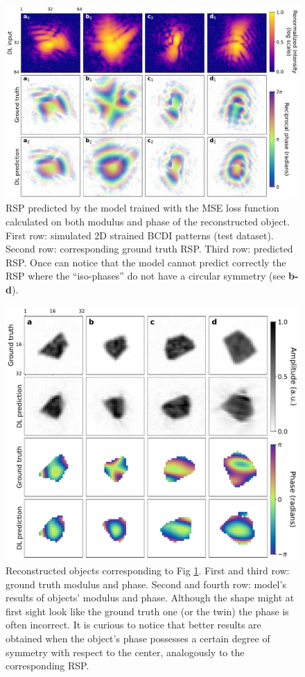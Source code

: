 \begin{figure}[H]
    \centering
    \includegraphics[width=\textwidth]{figures/Phasing/2D_hs_MSE_RSP.pdf}
    \caption{RSP predicted by the model trained with the MSE loss function calculated on both modulus and phase of the 
    reconstructed object. First row: simulated 2D strained BCDI patterns (test dataset). Second row: 
    corresponding ground truth RSP. Third row: predicted RSP. Once can notice that the model cannot predict correctly the 
    RSP where the ``iso-phases'' do not have a circular symmetry (see \textbf{b-d}).} 
    \label{fig:2D_hs_MSE_RSP}
\end{figure}

\begin{figure}[H]
    \centering
    \includegraphics[width=\textwidth]{figures/Phasing/2D_hs_MSE_obj.pdf}
    \caption{Reconstructed objects corresponding to Fig \ref{fig:2D_hs_MSE_RSP}. First and third row: ground truth modulus and phase. Second and fourth row: 
    model's results of objects' modulus and phase. Although the shape might at first sight look like the ground truth one (or 
    the twin) the phase is often incorrect. It is curious to notice that better results are obtained when the object's 
    phase possesses a certain degree of symmetry with respect to the center, analogously to the corresponding RSP. } 
    \label{fig:2D_hs_MSE_obj}
\end{figure}

